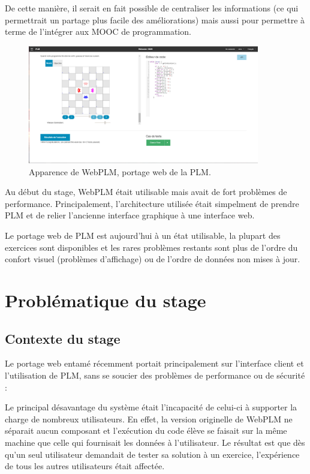 \documentclass[stage]{tnreport}
\begin{document}
De cette manière, il serait en fait possible de centraliser les informations (ce qui permettrait un partage plus facile des améliorations) mais aussi pour permettre à terme de l'intégrer aux MOOC de programmation.
\begin{figure}[h]
	\centering
		\includegraphics[width=0.9\textwidth]{figures/WebPLM-exercice1}
	\caption{Apparence de WebPLM, portage web de la PLM.}
	\label{fig:wplmEx1}
\end{figure}

Au début du stage, WebPLM était utilisable mais avait de fort problèmes de performance. Principalement, l'architecture utilisée était simpelment de prendre PLM et de relier l'ancienne interface graphique à une interface web.

Le portage web de PLM est aujourd'hui à un état utilisable, la plupart des exercices sont disponibles et les rares problèmes restants sont plus de l'ordre du confort visuel (problèmes d'affichage) ou de l'ordre de données non mises à jour.



\chapter{Problématique du stage}

\section{Contexte du stage}

Le portage web entamé récemment portait principalement sur l'interface client et l'utilisation de PLM, sans se soucier des problèmes de performance ou de sécurité :

Le principal désavantage du système était l'incapacité de celui-ci à supporter la charge de nombreux utilisateurs. En effet, la version originelle de WebPLM ne séparait aucun composant et l'exécution du code élève se faisait sur la même machine que celle qui fournisait les données à l'utilisateur. Le résultat est que dès qu'un seul utilisateur demandait de tester sa solution à un exercice, l'expérience de tous les autres utilisateurs était affectée.
\end{document}
